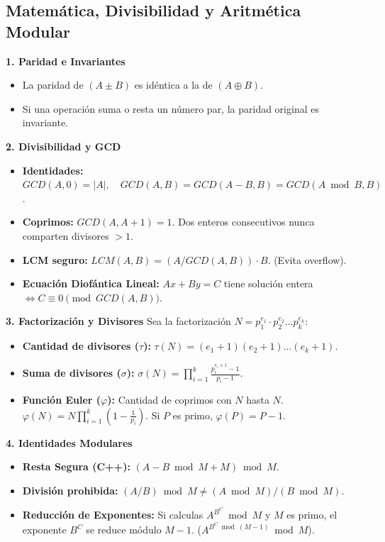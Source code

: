 \subsection{Matemática, Divisibilidad y Aritmética Modular}

\textbf{1. Paridad e Invariantes}
\begin{itemize}
    \item La paridad de $(A \pm B)$ es idéntica a la de $(A \oplus B)$.
    \item Si una operación suma o resta un número par, la paridad original es invariante.
\end{itemize}

\textbf{2. Divisibilidad y GCD}
\begin{itemize}
    \item \textbf{Identidades:} $GCD(A,0) = |A|, \quad GCD(A,B) = GCD(A-B, B) = GCD(A \bmod B, B)$.
    \item \textbf{Coprimos:} $GCD(A, A+1) = 1$. Dos enteros consecutivos nunca comparten divisores $>1$.
    \item \textbf{LCM seguro:} $LCM(A,B) = (A / GCD(A,B)) \cdot B$. (Evita overflow).
    \item \textbf{Ecuación Diofántica Lineal:} $Ax + By = C$ tiene solución entera $\iff C \equiv 0 \pmod{GCD(A,B)}$.
\end{itemize}

\textbf{3. Factorización y Divisores}
Sea la factorización $N = p_1^{e_1} \cdot p_2^{e_2} \dots p_k^{e_k}$:
\begin{itemize}
    \item \textbf{Cantidad de divisores ($\tau$):} $\tau(N) = (e_1 + 1)(e_2 + 1)\dots(e_k + 1)$.
    \item \textbf{Suma de divisores ($\sigma$):} $\sigma(N) = \prod_{i=1}^{k} \frac{p_i^{e_i+1}-1}{p_i-1}$.
    \item \textbf{Función Euler ($\varphi$):} Cantidad de coprimos con $N$ hasta $N$. \\ $\varphi(N) = N \prod_{i=1}^{k} (1 - \frac{1}{p_i})$. Si $P$ es primo, $\varphi(P) = P-1$.
\end{itemize}

\textbf{4. Identidades Modulares}
\begin{itemize}
    \item \textbf{Resta Segura (C++):} $(A - B \bmod M + M) \bmod M$.
    \item \textbf{División prohibida:} $(A/B) \bmod M \neq (A \bmod M) / (B \bmod M)$.
    \item \textbf{Reducción de Exponentes:} Si calculas $A^{B^C} \bmod M$ y $M$ es primo, el exponente $B^C$ se reduce módulo $M-1$. ($A^{B^C \bmod (M-1)} \bmod M$).
\end{itemize}

